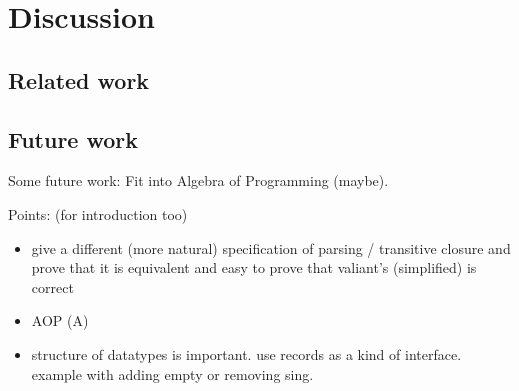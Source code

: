 \chapter{Discussion}
\section{Related work}
\section{Future work}
Some future work:
Fit into Algebra of Programming (maybe).

Points: (for introduction too)
\begin{itemize}
\item give a different (more natural) specification of parsing / transitive closure and prove that it is equivalent and easy to prove that valiant's (simplified) is correct 
\item AOP (A)
\item structure of datatypes is important. use records as a kind of interface. example with adding empty or removing sing.
\end{itemize}
